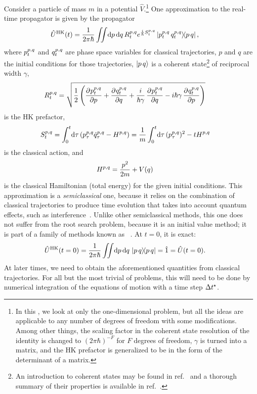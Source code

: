 Consider a particle of mass $m$ in a potential $\hat{V}$.\footnote{
	In this , we look at only the one-dimensional problem, but all the ideas are applicable to any number of degrees of freedom with some modifications.
	Among other things, the scaling factor in the coherent state resolution of the identity is changed to $(2 \pi \hbar)^{-F}$ for $F$ degrees of freedom, $\gamma$ is turned into a matrix, and the HK prefactor is generalized to be in the form of the determinant of a matrix.
}
One approximation to the real-time propagator is given by the  propagator~\cite{miller2002alternate}
\begin{align}
	\hat{U}\hk(t)
	&= \frac{1}{2 \pi \hbar} \iint\! \dif p \dif q \,
			R\coh{p}{q}_t e^{\frac{i}{\hbar} S\coh{p}{q}_t}
			\ketbra{p\coh{p}{q}_t \, q\coh{p}{q}_t}{p \, q},
\end{align}
where $p^{p,q}_t$ and $q^{p,q}_t$ are phase space variables for classical trajectories, $p$ and $q$ are the initial conditions for those trajectories, $\ket{p \, q}$ is a coherent state\footnote{
	An introduction to coherent states may be found in ref.~\cite[242-245]{schulman1996techniques} and a thorough summary of their properties is available in ref.~\cite[99-106]{gardiner2004quantum}.
} of reciprocal width $\gamma$,
\begin{align}
	R\coh{p}{q}_t
	&= \sqrt{\frac{1}{2} \left(
			\dpd{p\coh{p}{q}_t}{p}
			+ \dpd{q\coh{p}{q}_t}{q}
			+ \frac{i}{\hbar \gamma} \dpd{p\coh{p}{q}_t}{q}
			- i \hbar \gamma \dpd{q\coh{p}{q}_t}{p}
		\right)}
\end{align}
is the HK prefactor,
\begin{align}
	S\coh{p}{q}_t
	&= \int_0^t\! \dif \tau \, (p\coh{p}{q}_\tau \dot{q}\coh{p}{q}_\tau - H\coh{p}{q})
	= \frac{1}{m} \int_0^t\! \dif \tau \, (p\coh{p}{q}_\tau)^2 - t H\coh{p}{q}
\end{align}
is the classical action, and
\begin{align}
	H^{p,q}
	&= \frac{p^2}{2 m} + V(q)
\end{align}
is the classical Hamiltonian (total energy) for the given initial conditions.
This approximation is a \emph{semiclassical} one, because it relies on the combination of classical trajectories to produce time evolution that takes into account quantum effects, such as interference~\cite{gelabert2000log,thoss2001generalized}.
Unlike other semiclassical methods, this one does not suffer from the root search problem, because it is an initial value method; it is part of a family of methods known as ~\cite{gelabert2000log}.
At $t = 0$, it is exact:
\begin{align}
	\hat{U}\hk(t = 0)
	&= \frac{1}{2 \pi \hbar} \iint\! \dif p \dif q \, \ketbra{p \, q}{p \, q}
	= \hat{1}
	= \hat{U}(t = 0).
\end{align}
At later times, we need to obtain the aforementioned quantities from classical trajectories.
For all but the most trivial of problems, this will need to be done by numerical integration of the equations of motion with a time step $\Delta t^\star$.

